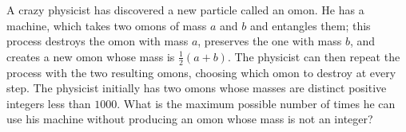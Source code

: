 A crazy physicist has discovered a new particle called an omon. He has a machine, which takes two omons of mass $a$ and $b$ and entangles them; this process destroys the omon with mass $a$, preserves the one with mass $b$, and creates a new omon whose mass is $\frac 12 (a+b)$. The physicist can then repeat the process with the two resulting omons, choosing which omon to destroy at every step. The physicist initially has two omons whose masses are distinct positive integers less than $1000$. What is the maximum possible number of times he can use his machine without producing an omon whose mass is not an integer?
